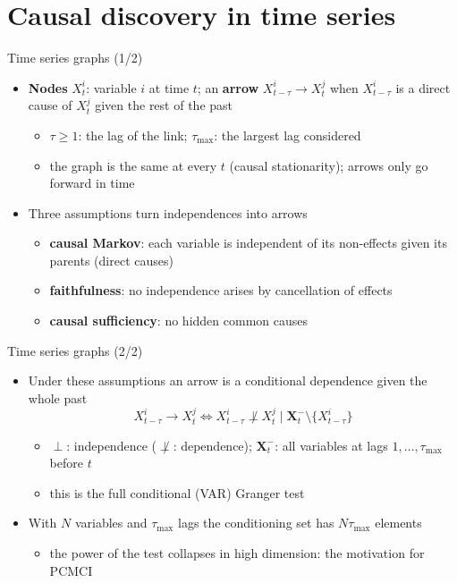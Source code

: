 \section{Causal discovery in time series}

\begin{frame}{Time series graphs (1/2)}
\itemsize{\small}
\begin{itemize}
    \item \textbf{Nodes} $X^i_t$: variable $i$ at time $t$; an \textbf{arrow} $X^i_{t-\tau}\to X^j_t$ when $X^i_{t-\tau}$ is a direct cause of $X^j_t$ given the rest of the past 
    \begin{itemize}
        \item $\tau \ge 1$: the lag of the link; $\tau_{\max}$: the largest lag considered
        \item the graph is the same at every $t$ (causal stationarity); arrows only go forward in time
    \end{itemize}
    \item Three assumptions turn independences into arrows 
    \begin{itemize}
        \item \textbf{causal Markov}: each variable is independent of its non-effects given its parents (direct causes)
        \item \textbf{faithfulness}: no independence arises by cancellation of effects
        \item \textbf{causal sufficiency}: no hidden common causes
    \end{itemize}
\end{itemize}
\end{frame}

\begin{frame}{Time series graphs (2/2)}
\itemsize{\small}
\begin{itemize}
    \item Under these assumptions an arrow is a conditional dependence given the whole past \[ X^i_{t-\tau}\to X^j_t \iff X^i_{t-\tau} \not\perp X^j_t \mid \mathbf X^-_t\setminus\{X^i_{t-\tau}\} \]
    \begin{itemize}
        \item $\perp$: independence ($\not\perp$: dependence); $\mathbf X^-_t$: all variables at lags $1, \dots, \tau_{\max}$ before $t$
        \item this is the full conditional (VAR) Granger test
    \end{itemize}
    \item With $N$ variables and $\tau_{\max}$ lags the conditioning set has $N\tau_{\max}$ elements
    \begin{itemize}
        \item the power of the test collapses in high dimension: the motivation for PCMCI
    \end{itemize}
\end{itemize}
\end{frame}


